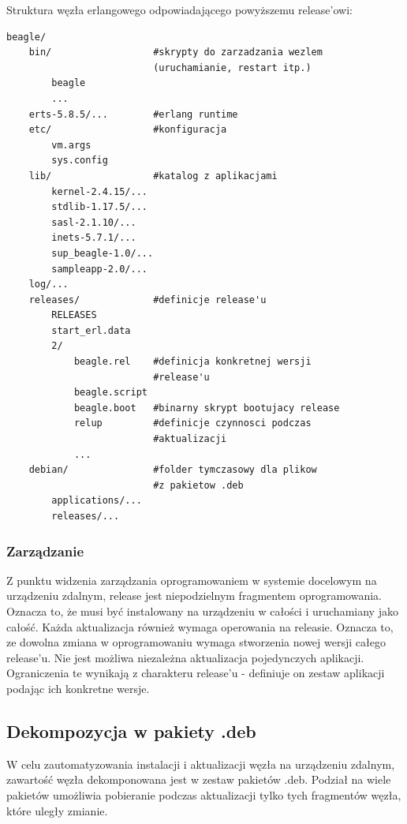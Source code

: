 \documentclass[polish,12pt]{aghthesis}
\begin{document}
Struktura węzła erlangowego odpowiadającego powyższemu release'owi:

\begin{verbatim}
beagle/
    bin/                  #skrypty do zarzadzania wezlem
                          (uruchamianie, restart itp.)
        beagle
        ...
    erts-5.8.5/...        #erlang runtime
    etc/                  #konfiguracja
        vm.args
        sys.config
    lib/                  #katalog z aplikacjami
        kernel-2.4.15/...
        stdlib-1.17.5/...
        sasl-2.1.10/...
        inets-5.7.1/...
        sup_beagle-1.0/...
        sampleapp-2.0/...
    log/...
    releases/             #definicje release'u
        RELEASES
        start_erl.data
        2/
            beagle.rel    #definicja konkretnej wersji
                          #release'u
            beagle.script
            beagle.boot   #binarny skrypt bootujacy release
            relup         #definicje czynnosci podczas
                          #aktualizacji
            ...
    debian/               #folder tymczasowy dla plikow
                          #z pakietow .deb
        applications/...
        releases/...
\end{verbatim}

\subsubsection{Zarządzanie}

Z punktu widzenia zarządzania oprogramowaniem w systemie docelowym na urządzeniu zdalnym, release jest niepodzielnym fragmentem oprogramowania. Oznacza to, że musi być instalowany na urządzeniu w całości i uruchamiany jako całość. Każda aktualizacja również wymaga operowania na releasie. Oznacza to, ze dowolna zmiana w oprogramowaniu wymaga stworzenia nowej wersji całego release'u. Nie jest możliwa niezależna aktualizacja pojedynczych aplikacji. Ograniczenia te wynikają z charakteru release'u - definiuje on zestaw aplikacji podając ich konkretne wersje.

\subsection{Dekompozycja w pakiety .deb}

W celu zautomatyzowania instalacji i aktualizacji węzła na urządzeniu zdalnym, zawartość węzła dekomponowana jest w zestaw pakietów .deb. Podział na wiele pakietów umożliwia pobieranie podczas aktualizacji tylko tych fragmentów węzła, które uległy zmianie.
\end{document}
